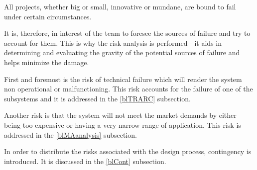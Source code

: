 All projects, whether big or small, innovative or mundane, are bound to fail under certain circumstances.

It is, therefore, in interest of the team to foresee the sources of failure and try to account for them.  This is why the risk analysis is performed - it aids in determining and evaluating the gravity of the potential sources of failure and helps minimize the damage. 

First and foremost is the risk of technical failure which will render the system non operational or malfunctioning. This risk accounts for the failure of one of the subsystems and it is addressed in the \ref{blTRARC} subsection.

Another risk is that the system will not meet the market demands by either being too expensive or having a very narrow range of application. This risk is addressed in the \ref{blMAanalysis} subsection. 

In order to distribute the risks associated with the design process, contingency is introduced. It is discussed in the \ref{blCont} subsection.
